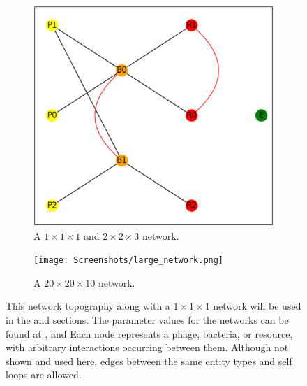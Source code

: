 \begin{figure}
\begin{subfigure}{0.49\linewidth}
        \includegraphics[width=\linewidth]{Screenshots/example_network.png}
        \caption{
            A $1\times1\times1$ and $2\times 2 \times 3$ network. 
        }
        \label{fig:ss:example_network}
    \end{subfigure} 
    \begin{subfigure}{0.49\linewidth}
        \centering
        \captionsetup{width=1\linewidth}
        \texttt{[image: Screenshots/large\_network.png]}
        \caption{
            A $20\times20\times10$ network. 
        }
        \label{fig:ss:example_large_network}
    \end{subfigure} 
    \caption{
        This network topography along with a $1 \times 1 \times 1$ network will be used in the  and  sections. 
            The parameter values for the networks can be found at ,  and 
        Each node represents a phage, bacteria, or resource, with arbitrary interactions occurring between them. 
        Although not shown and used here, edges between the same entity types and self loops are allowed. 
    }
    \label{fig:ss:GUI_tool_and_network}
 \end{figure}

